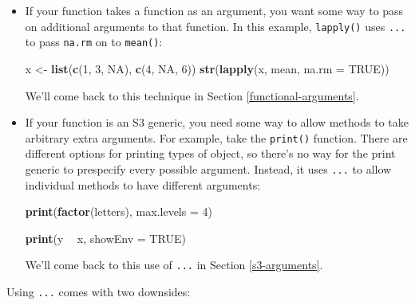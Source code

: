 \documentclass[]{book}
\newenvironment{Shaded}{\begin{snugshade}}{\end{snugshade}}
\newcommand{\DataTypeTok}[1]{\textcolor[rgb]{0.13,0.29,0.53}{#1}}
\newcommand{\DecValTok}[1]{\textcolor[rgb]{0.00,0.00,0.81}{#1}}
\newcommand{\KeywordTok}[1]{\textcolor[rgb]{0.13,0.29,0.53}{\textbf{#1}}}
\newcommand{\NormalTok}[1]{#1}
\newcommand{\OperatorTok}[1]{\textcolor[rgb]{0.81,0.36,0.00}{\textbf{#1}}}
\newcommand{\OtherTok}[1]{\textcolor[rgb]{0.56,0.35,0.01}{#1}}
\newcommand{\StringTok}[1]{\textcolor[rgb]{0.31,0.60,0.02}{#1}}
\theoremstyle{definition}
\theoremstyle{definition}
\theoremstyle{definition}
\theoremstyle{remark}
\begin{document}
\begin{itemize}
\item
  If your function takes a function as an argument, you want some way to
  pass on additional arguments to that function. In this example,
  \texttt{lapply()} uses \texttt{...} to pass \texttt{na.rm} on to
  \texttt{mean()}:

\begin{Shaded}
\begin{Highlighting}[]
\NormalTok{x <-}\StringTok{ }\KeywordTok{list}\NormalTok{(}\KeywordTok{c}\NormalTok{(}\DecValTok{1}\NormalTok{, }\DecValTok{3}\NormalTok{, }\OtherTok{NA}\NormalTok{), }\KeywordTok{c}\NormalTok{(}\DecValTok{4}\NormalTok{, }\OtherTok{NA}\NormalTok{, }\DecValTok{6}\NormalTok{))}
\KeywordTok{str}\NormalTok{(}\KeywordTok{lapply}\NormalTok{(x, mean, }\DataTypeTok{na.rm =} \OtherTok{TRUE}\NormalTok{))}
\end{Highlighting}
\end{Shaded}

  We'll come back to this technique in Section
  \ref{functional-arguments}.
\item
  If your function is an S3 generic, you need some way to allow methods
  to take arbitrary extra arguments. For example, take the
  \texttt{print()} function. There are different options for printing
  types of object, so there's no way for the print generic to prespecify
  every possible argument. Instead, it uses \texttt{...} to allow
  individual methods to have different arguments:

\begin{Shaded}
\begin{Highlighting}[]
\KeywordTok{print}\NormalTok{(}\KeywordTok{factor}\NormalTok{(letters), }\DataTypeTok{max.levels =} \DecValTok{4}\NormalTok{)}

\KeywordTok{print}\NormalTok{(y }\OperatorTok{~}\StringTok{ }\NormalTok{x, }\DataTypeTok{showEnv =} \OtherTok{TRUE}\NormalTok{)}
\end{Highlighting}
\end{Shaded}

  We'll come back to this use of \texttt{...} in Section
  \ref{s3-arguments}.
\end{itemize}

Using \texttt{...} comes with two downsides:
\end{document}
